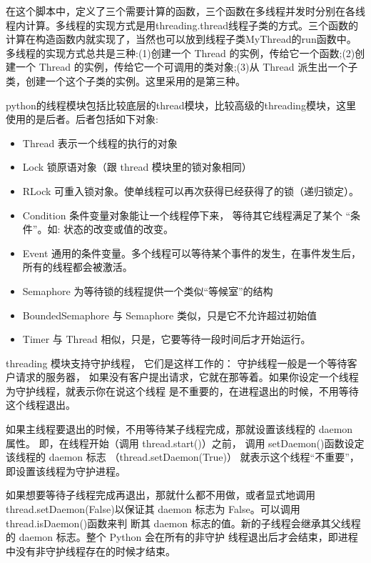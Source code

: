 \documentclass[twoside,11pt]{book}
\begin{document}
在这个脚本中，定义了三个需要计算的函数，三个函数在多线程并发时分别在各线程内计算。多线程的实现方式是用threading.thread线程子类的方式。三个函数的计算在构造函数内就实现了，当然也可以放到线程子类MyThread的run函数中。多线程的实现方式总共是三种:(1)创建一个 Thread 的实例，传给它一个函数;(2)创建一个 Thread 的实例，传给它一个可调用的类对象;(3)从 Thread 派生出一个子类，创建一个这个子类的实例。这里采用的是第三种。

python的线程模块包括比较底层的thread模块，比较高级的threading模块，这里使用的是后者。后者包括如下对象:
\begin{itemize}
  \item Thread 表示一个线程的执行的对象
  \item Lock 锁原语对象（跟 thread 模块里的锁对象相同）
  \item RLock 可重入锁对象。使单线程可以再次获得已经获得了的锁（递归锁定）。
  \item Condition 条件变量对象能让一个线程停下来， 等待其它线程满足了某个 “条件”。如: 状态的改变或值的改变。
  \item Event 通用的条件变量。多个线程可以等待某个事件的发生，在事件发生后，所有的线程都会被激活。
  \item Semaphore 为等待锁的线程提供一个类似“等候室”的结构
  \item BoundedSemaphore 与 Semaphore 类似，只是它不允许超过初始值
  \item Timer 与 Thread 相似，只是，它要等待一段时间后才开始运行。
\end{itemize}
threading 模块支持守护线程， 它们是这样工作的： 守护线程一般是一个等待客户请求的服务器，
如果没有客户提出请求，它就在那等着。如果你设定一个线程为守护线程，就表示你在说这个线程
是不重要的，在进程退出的时候，不用等待这个线程退出。

如果主线程要退出的时候，不用等待某子线程完成，那就设置该线程的 daemon 属性。
即，在线程开始（调用 thread.start()）之前， 调用 setDaemon()函数设定该线程的 daemon 标志
（thread.setDaemon(True)） 就表示这个线程“不重要”，即设置该线程为守护进程。

如果想要等待子线程完成再退出，那就什么都不用做，或者显式地调用
thread.setDaemon(False)以保证其 daemon 标志为 False。可以调用 thread.isDaemon()函数来判
断其 daemon 标志的值。新的子线程会继承其父线程的 daemon 标志。整个 Python 会在所有的非守护
线程退出后才会结束，即进程中没有非守护线程存在的时候才结束。
\end{document}
